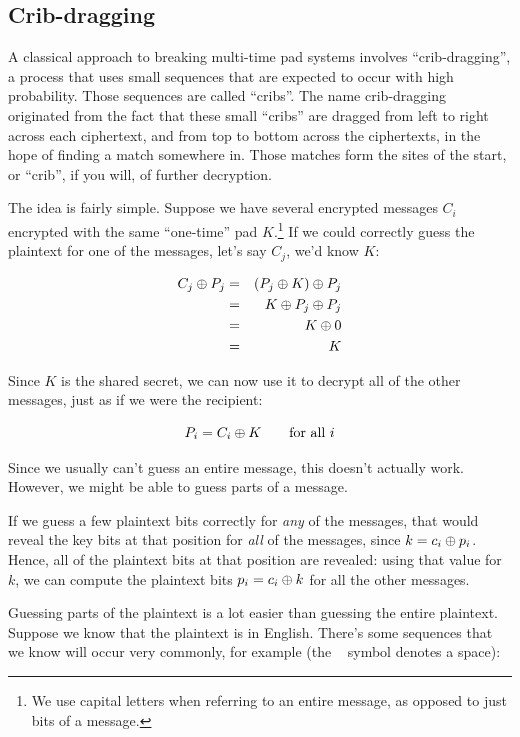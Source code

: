 \documentclass[11pt,ebook,table,dvipsnames]{memoir}
\begin{document}
\subsection{Crib-dragging}
\label{sec-2-1-5-3}

A classical approach to breaking multi-time pad systems involves
\enquote{crib-dragging}, a process that uses small sequences that are expected
to occur with high probability. Those sequences are called \enquote{cribs}.
The name crib-dragging originated from the fact that these small
\enquote{cribs} are dragged from left to right across each ciphertext, and
from top to bottom across the ciphertexts, in the hope of finding a
match somewhere in. Those matches form the sites of the start, or
\enquote{crib}, if you will, of further decryption.

The idea is fairly simple. Suppose we have several encrypted messages
$C_i$ encrypted with the same \enquote{one-time} pad $K$.\footnote{We use capital
letters when referring to an entire message, as opposed to just bits
of a message.} If we could correctly guess the plaintext for one of
the messages, let's say $C_j$, we'd know $K$:

\begin{eqnarray*}
C_j \oplus P_j
&=& (P_j \oplus K) \oplus P_j \\
&=& K \oplus P_j \oplus P_j \\
&=& K \oplus 0 \\
&=& K
\end{eqnarray*}

Since $K$ is the shared secret, we can now use it to decrypt all of
the other messages, just as if we were the recipient:

\[
P_i = C_i \oplus K \qquad \text{for all }i
\]

Since we usually can't guess an entire message, this doesn't actually
work. However, we might be able to guess parts of a message.

If we guess a few plaintext bits correctly for \emph{any} of the messages,
that would reveal the key bits at that position for \emph{all} of the
messages, since $k = c_i \oplus p_i$. Hence, all of the plaintext bits
at that position are revealed: using that value for $k$, we can
compute the plaintext bits $p_i = c_i \oplus k$ for all the other
messages.

Guessing parts of the plaintext is a lot easier than guessing the
entire plaintext. Suppose we know that the plaintext is in English.
There's some sequences that we know will occur very commonly, for
example (the \verb*| | symbol denotes a space):
\end{document}
